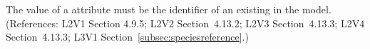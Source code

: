 The value of a \SpeciesReference {} attribute must be the
identifier of an existing \Species in the model.  (References: L2V1 Section
4.9.5; L2V2 Section~4.13.2; L2V3 Section~4.13.3; L2V4 Section~4.13.3; 
L3V1 Section~\ref{subsec:speciesreference}.)
